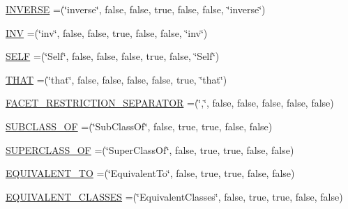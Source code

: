 \begin{DoxyCompactItemize}
\item 
\hyperlink{enumorg_1_1coode_1_1owlapi_1_1manchesterowlsyntax_1_1_manchester_o_w_l_syntax_a6dfc300c2d1008f41d9a639b63b5d670}{I\-N\-V\-E\-R\-S\-E} =(\char`\"{}inverse\char`\"{}, false, false, true, false, false, \char`\"{}inverse\char`\"{})
\item 
\hyperlink{enumorg_1_1coode_1_1owlapi_1_1manchesterowlsyntax_1_1_manchester_o_w_l_syntax_af31d4df6fce74f28df19f3e193883984}{I\-N\-V} =(\char`\"{}inv\char`\"{}, false, false, true, false, false, \char`\"{}inv\char`\"{})
\item 
\hyperlink{enumorg_1_1coode_1_1owlapi_1_1manchesterowlsyntax_1_1_manchester_o_w_l_syntax_ab23d1c14f7d0cabb3dec078b45f82817}{S\-E\-L\-F} =(\char`\"{}Self\char`\"{}, false, false, false, true, false, \char`\"{}Self\char`\"{})
\item 
\hyperlink{enumorg_1_1coode_1_1owlapi_1_1manchesterowlsyntax_1_1_manchester_o_w_l_syntax_aa979cbe5eeab9242d5b9c127a49d8203}{T\-H\-A\-T} =(\char`\"{}that\char`\"{}, false, false, false, false, true, \char`\"{}that\char`\"{})
\item 
\hyperlink{enumorg_1_1coode_1_1owlapi_1_1manchesterowlsyntax_1_1_manchester_o_w_l_syntax_aee04f7df1c35f7c0770dee02a78bea67}{F\-A\-C\-E\-T\-\_\-\-R\-E\-S\-T\-R\-I\-C\-T\-I\-O\-N\-\_\-\-S\-E\-P\-A\-R\-A\-T\-O\-R} =(\char`\"{},\char`\"{}, false, false, false, false, false)
\item 
\hyperlink{enumorg_1_1coode_1_1owlapi_1_1manchesterowlsyntax_1_1_manchester_o_w_l_syntax_a0cd0c9bbf3377b9375e3ea24260a2ed8}{S\-U\-B\-C\-L\-A\-S\-S\-\_\-\-O\-F} =(\char`\"{}Sub\-Class\-Of\char`\"{}, false, true, true, false, false)
\item 
\hyperlink{enumorg_1_1coode_1_1owlapi_1_1manchesterowlsyntax_1_1_manchester_o_w_l_syntax_a0012e0dc5a88b3fa2f43ac34380e30c5}{S\-U\-P\-E\-R\-C\-L\-A\-S\-S\-\_\-\-O\-F} =(\char`\"{}Super\-Class\-Of\char`\"{}, false, true, true, false, false)
\item 
\hyperlink{enumorg_1_1coode_1_1owlapi_1_1manchesterowlsyntax_1_1_manchester_o_w_l_syntax_af078eab4750f3afc12f094fd494ff1cd}{E\-Q\-U\-I\-V\-A\-L\-E\-N\-T\-\_\-\-T\-O} =(\char`\"{}Equivalent\-To\char`\"{}, false, true, true, false, false)
\item 
\hyperlink{enumorg_1_1coode_1_1owlapi_1_1manchesterowlsyntax_1_1_manchester_o_w_l_syntax_a664a0013917a7a89f21b48d08450418c}{E\-Q\-U\-I\-V\-A\-L\-E\-N\-T\-\_\-\-C\-L\-A\-S\-S\-E\-S} =(\char`\"{}Equivalent\-Classes\char`\"{}, false, true, true, false, false)
\item 

\end{DoxyCompactItemize}
